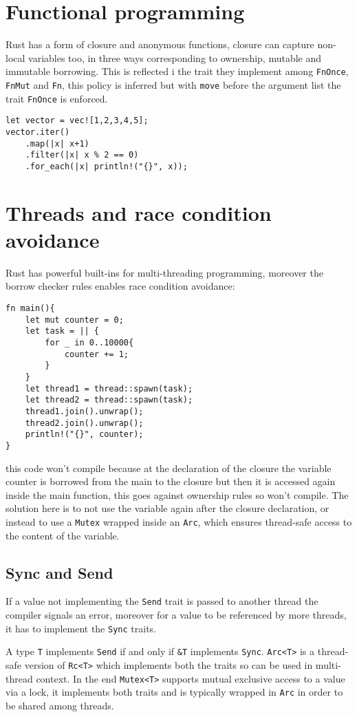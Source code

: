 \section{Functional programming}
Rust has a form of closure and anonymous functions, closure can capture non-local variables too, in three ways corresponding to ownership, mutable and immutable borrowing.
This is reflected i the trait they implement among \verb|FnOnce|, \verb|FnMut| and \verb|Fn|, this policy is inferred but with \verb|move| before the argument list the trait \verb|FnOnce| is enforced.
\begin{verbatim}
let vector = vec![1,2,3,4,5];
vector.iter()
    .map(|x| x+1)
    .filter(|x| x % 2 == 0)
    .for_each(|x| println!("{}", x));
\end{verbatim}

\section{Threads and race condition avoidance}
Rust has powerful built-ins for multi-threading programming, moreover the borrow checker rules enables race condition avoidance:
\begin{verbatim}
fn main(){
    let mut counter = 0;
    let task = || {
        for _ in 0..10000{
            counter += 1;
        }
    }
    let thread1 = thread::spawn(task);
    let thread2 = thread::spawn(task);
    thread1.join().unwrap();
    thread2.join().unwrap();
    println!("{}", counter);
}
\end{verbatim}
this code won't compile because at the declaration of the closure the variable counter is borrowed from the main to the closure but then it is accessed again inside the main function, this goes against ownership rules so won't compile.
The solution here is to not use the variable again after the closure declaration, or instead to use a \verb|Mutex| wrapped inside an \verb|Arc|, which ensures thread-safe access to the content of the variable.

\subsection{Sync and Send}
If a value not implementing the \verb|Send| trait is passed to another thread the compiler signals an error, moreover for a value to be referenced by more threads, it has to implement the \verb|Sync| traits.

A type \verb|T| implements \verb|Send| if and only if \verb|&T| implements \verb|Sync|.
\verb|Arc<T>| is a thread-safe version of \verb|Rc<T>| which implements both the traits so can be used in multi-thread context.
In the end \verb|Mutex<T>| supports mutual exclusive access to a value via a lock, it implements both traits and is typically wrapped in \verb|Arc| in order to be shared among threads.

